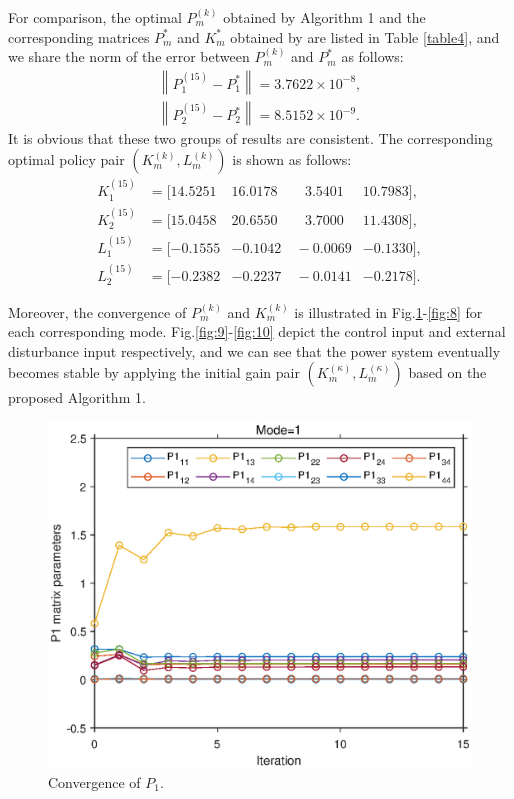 \documentclass[journal]{IEEEtran}
\begin{document}
For comparison,  the optimal $P_{m }^{(k)}$  obtained by  Algorithm 1 and the corresponding matrices $P_{m }^{*}$ and $K_{m }^{*}$ obtained by \cite{se1whn} are listed in Table \ref{table4}, and we share the norm of the error between $P_{m }^{(k)}$ and  $P_{m }^{*}$ as follows:
\begin{align*}
\left\lVert P_{1}^{(15)}-P_{1}^{*}\right\rVert=3.7622\times 10^{-8},\\
\left\lVert P_{2}^{(15)}-P_{2}^{*}\right\rVert= 8.5152\times 10^{-9}.
\end{align*}
It is obvious that these two groups of results are consistent. The corresponding optimal policy pair  $(K_{m }^{(k)},L_{m }^{(k)})$ is shown as follows:
\begin{align*}
	{K}^{(15)}_{1}&=[14.5251 & 16.0178 &~~~~  3.5401 &  10.7983],\\
	{K}^{(15)}_{2}&=[ 15.0458 &  20.6550 &~~~~   3.7000 &  11.4308],\\
	{L}^{(15)}_{1}&=[-0.1555 &  -0.1042  &~ -0.0069 &  -0.1330],\\
	{L}^{(15)}_{2}&=[-0.2382 &  -0.2237 &~  -0.0141 &  -0.2178].
\end{align*}

Moreover, the convergence of  $P_{m }^{(k)}$  and  $K_{m }^{(k)}$  is illustrated in Fig.\ref{fig:5}-\ref{fig:8} for each corresponding mode. Fig.\ref{fig:9}-\ref{fig:10} depict the control input and external disturbance input respectively, and we can see that the power system eventually becomes stable by applying the initial gain pair $({K}_{m}^{(\kappa)},{L}_{m}^{(\kappa)})$ based on the proposed Algorithm 1.

\begin{figure} %
	\centering
	\includegraphics[scale=0.6]{elementP1mode1.eps}
	\caption{Convergence of $P_{1}$.}
	\label{fig:5}
\end{figure}
\end{document}
